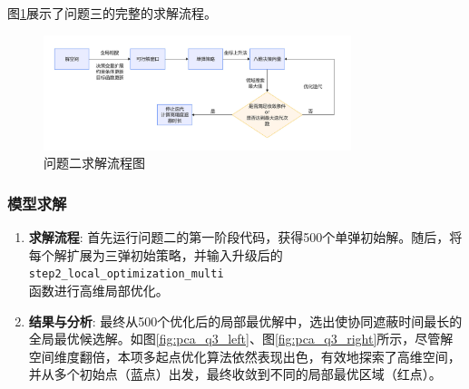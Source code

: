 \documentclass[12pt]{article}
\newcommand{\code}[1]{\texttt{#1}} %
\begin{document}
\begin{CJK}{UTF8}{gbsn}
		图\ref{fig:flowchart_q3}展示了问题三的完整的求解流程。
		
		
		\begin{figure}[H]
			\centering
			\includegraphics[width=0.8\textwidth]{pic/Fg7-Pb3.jpg}
			\caption{问题二求解流程图}
			\label{fig:flowchart_q3}
		\end{figure}
		
		\subsubsection{模型求解}
		\begin{enumerate}
			\item \textbf{求解流程}: 首先运行问题二的第一阶段代码，获得500个单弹初始解。随后，将每个解扩展为三弹初始策略，并输入升级后的\code{step2\_local\_optimization\_multi}\\函数进行高维局部优化。
			
			\item \textbf{结果与分析}: 最终从500个优化后的局部最优解中，选出使协同遮蔽时间最长的全局最优候选解。如图\ref{fig:pca_q3_left}、图\ref{fig:pca_q3_right}所示，尽管解空间维度翻倍，本项多起点优化算法依然表现出色，有效地探索了高维空间，并从多个初始点（蓝点）出发，最终收敛到不同的局部最优区域（红点）。
			

\end{enumerate}
\end{CJK}
\end{document}
